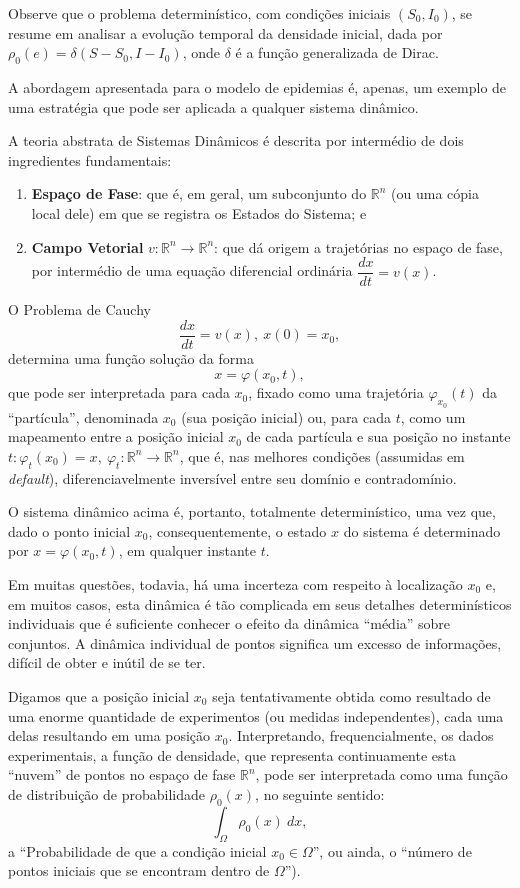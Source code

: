 Observe que o problema determinístico, com condições iniciais \((S_0, I_0)\), se resume em analisar a evolução temporal da densidade inicial, dada por \(\rho_0(e) = \delta(S - S_0, I - I_0)\), onde \(\delta\) é a função generalizada de Dirac.

A abordagem apresentada para o modelo de epidemias é, apenas, um exemplo de uma estratégia que pode ser aplicada a qualquer sistema dinâmico.

A teoria abstrata de Sistemas Dinâmicos é descrita por intermédio de dois ingredientes fundamentais:

\begin{enumerate}
\item \textbf{Espaço de Fase}: que é, em geral, um subconjunto do \(\mathbb{R}^n\) (ou uma cópia local dele) em que se registra os Estados do Sistema; e
\item \textbf{Campo Vetorial} \(v: \mathbb{R}^n \to \mathbb{R}^n\): que dá origem a trajetórias no espaço de fase, por intermédio de uma equação diferencial ordinária \(\dfrac{dx}{dt} = v(x)\).
\end{enumerate}

O Problema de Cauchy
\[\dfrac{dx}{dt} = v(x),\ x(0) = x_0,\]
determina uma função solução da forma
\[x = \varphi(x_0, t),\]
que pode ser interpretada para cada \(x_0\), fixado como uma trajetória \(\varphi_{x_0}(t)\) da ``partícula'', denominada \(x_0\) (sua posição inicial) ou, para cada \(t\), como um mapeamento entre a posição inicial \(x_0\) de cada partícula e sua posição no instante \(t: \varphi_t(x_0) = x,\ \varphi_t: \mathbb{R}^n \to \mathbb{R}^n\), que é, nas melhores condições (assumidas em \textit{default}), diferenciavelmente inversível entre seu domínio e contradomínio.

O sistema dinâmico acima é, portanto, totalmente determinístico, uma vez que, dado o ponto inicial \(x_0\), consequentemente, o estado \(x\) do sistema é determinado por \(x = \varphi(x_0, t)\), em qualquer instante \(t\).

Em muitas questões, todavia, há uma incerteza com respeito à localização \(x_0\) e, em muitos casos, esta dinâmica é tão complicada em seus detalhes determinísticos individuais que é suficiente conhecer o efeito da dinâmica ``média'' sobre conjuntos. A dinâmica individual de pontos significa um excesso de informações, difícil de obter e inútil de se ter.

Digamos que a posição inicial \(x_0\) seja tentativamente obtida como resultado de uma enorme quantidade de experimentos (ou medidas independentes), cada uma delas resultando em uma posição \(x_0\). Interpretando, frequencialmente, os dados experimentais, a função de densidade, que representa continuamente esta ``nuvem'' de pontos no espaço de fase \(\mathbb{R}^n\), pode ser interpretada como uma função de distribuição de probabilidade \(\rho_0(x)\), no seguinte sentido:
\[\displaystyle\int_{\Omega} \rho_0(x)\ dx,\] a ``Probabilidade de que a condição inicial \(x_0 \in \Omega\)'', ou ainda, o ``número de pontos iniciais que se encontram dentro de \(\Omega\)''). 

